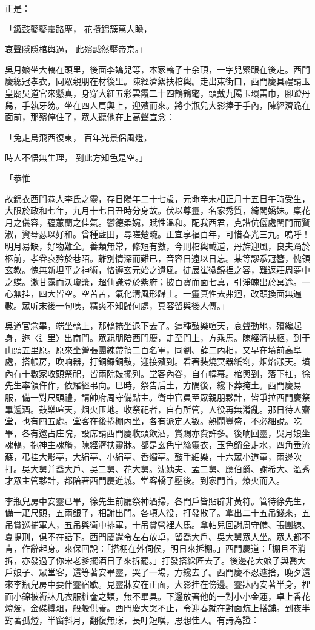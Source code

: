 正是：

「鑼鼓鼕鼕靄路塵，  花攢錦簇萬人瞻，

哀聲隱隱棺輿過，  此殯誠然壓帝京。」

吳月娘坐大轎在頭里，後面李嬌兒等，本家轎子十余頂，一字兒緊跟在後走。西門慶總冠孝衣，同眾親朋在材後里。陳經濟絮扶棺輿。走出東街口，西門慶具禮請玉皇廟吳道官來懸真，身穿大紅五彩雲霞二十四鶴鶴氅，頭戴九陽玉環雷巾，腳蹬丹舄，手執牙笏。坐在四人肩輿上，迎殯而來。將李瓶兒大影捧于手內，陳經濟跪在面前，那殯停住了，眾人聽他在上高聲宣念：

「兔走烏飛西復東，  百年光景侶風燈，

時人不悟無生理，  到此方知色是空。」

「恭惟

故錦衣西門恭人李氏之靈，存日陽年二十七歲，元命辛未相正月十五日午時受生，大限於政和七年，九月十七日丑時分身故。伏以尊靈，名家秀質，綺閣嬌妹。稟花月之儀容，蘊蕙蘭之佳氣。鬱德柔婉，賦性溫和。配我西君，克諧伉儷處閨門而賢淑，資琴瑟以好和。曾種藍田，尋嗟楚畹。正宜享福百年，可惜春光三九。嗚呼！明月易缺，好物難全。善類無常，修短有數，今則棺輿載道，丹旆迎風，良夫踊於柩前，孝眷哀矜於巷陌。離別情深而難已，音容日遠以日忘。某等謬忝冠簪，愧領玄教。愧無新坦平之神術，恪遵玄元始之遺風。徒展崔徽鏡裡之容，難返莊周夢中之蝶。漱甘露而沃瓊漿，超仙識登於紫府；披百寶而面七真，引淨魄出於冥途。一心無挂，四大皆空。空苦苦，氣化清風形歸土。一靈真性去弗迴，改頭換面無遍數。眾听末後一句咦，精爽不知歸何處，真容留與後人傳。」

吳道官念畢，端坐轎上，那轎捲坐退下去了。這種鼓樂喧天，哀聲動地，殯纔起身，迤〈辶里〉出南門。眾親朋陪西門慶，走至門上，方乘馬。陳經濟扶柩，到于山頭五里原。原來坐營張團練帶領二百名軍，同劉、薛二內相，又早在墳前高阜處，搭帳房，吹响器，打銅鑼銅鼓，迎接殯到。看著裝燒冥器紙劄，烟焰漲天。墳內有十數家收頭祭祀，皆兩院妓擺列。堂客內眷，自有幃幕。棺輿到，落下扛，徐先生率領仵作，依羅經弔向。巳時，祭告后土，方隅後，纔下葬掩土。西門慶易服，備一對尺頭禮，請帥府周守備點主。衛中官員至眾親朋夥計，皆爭拉西門慶祭畢遞酒。鼓樂喧天，烟火匝地。收祭祀者，自有所管，人役再無淆亂。那日待人齋堂，也有四五處。堂客在後捲棚內坐，各有派定人數。熱鬧豐盛，不必細說。吃畢，各有邀占庄院，設席請西門慶收頭飲酒，賞賜亦費許多。後响回靈，吳月娘坐魂轎，抱神主魂旛，陳經濟扶靈牀。都是玄色宁絲靈衣，玉色銷金走水，四角垂流蘇，弔挂大影亭，大絹亭、小絹亭、香燭亭。鼓手細樂，十六眾小道童，兩邊吹打。吳大舅并喬大戶、吳二舅、花大舅。沈姨夫、孟二舅、應伯爵、謝希大、溫秀才眾主管夥計，都陪著西門慶進城。堂客轎子壓後。到家門首，燎火而入。

李瓶兒房中安靈已畢，徐先生前廳祭神酒掃，各門戶皆貼辟非黃符。管待徐先生，備一疋尺頭，五兩銀子，相謝出門。各項人役，打發散了。拿出二十五吊錢來，五吊賞巡捕軍人，五吊與衛中排軍，十吊賞營裡人馬。拿帖兒回謝周守備、張團練、夏提刑，俱不在話下。西門慶還令左右放卓，留喬大戶、吳大舅眾人坐。眾人都不肯，作辭起身。來保回說：「搭棚在外伺侯，明日來拆棚。」西門慶道：「棚且不消拆，亦發過了你宋老爹擺酒日子來拆罷。」打發搭綵匠去了。後邊花大娘子與喬大戶娘子、眾堂客，還等著安畢靈，哭了一場，方纔去了。西門慶不忍遽捨，晚夕還來李瓶兒房中要伴靈宿歇。見靈牀安在正面，大影挂在傍邊。靈牀內安著半身，裡面小錦被褥牀几衣服粧奩之類，無不畢具。下邊放著他的一對小小金蓮，卓上香花燈燭，金碟樽俎，般般供養。西門慶大哭不止，令迎春就在對面炕上搭鋪。到夜半對著孤燈，半窗斜月，翻復無寐，長吁短嘆，思想佳人。有詩為證：

